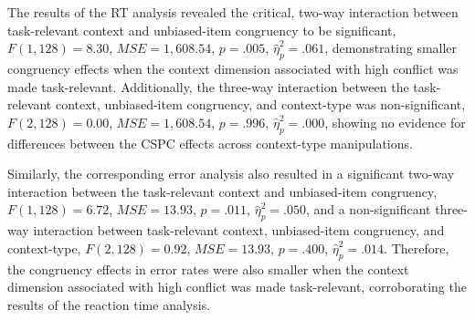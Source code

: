 \documentclass[english,,man,floatsintext]{apa6}
\begin{document}
The results of the RT analysis revealed the critical, two-way
interaction between task-relevant context and unbiased-item congruency
to be significant, \(F(1, 128) = 8.30\), \(\mathit{MSE} = 1,608.54\),
\(p = .005\), \(\hat{\eta}^2_p = .061\), demonstrating smaller
congruency effects when the context dimension associated with high
conflict was made task-relevant. Additionally, the three-way interaction
between the task-relevant context, unbiased-item congruency, and
context-type was non-significant, \(F(2, 128) = 0.00\),
\(\mathit{MSE} = 1,608.54\), \(p = .996\), \(\hat{\eta}^2_p = .000\),
showing no evidence for differences between the CSPC effects across
context-type manipulations.

Similarly, the corresponding error analysis also resulted in a
significant two-way interaction between the task-relevant context and
unbiased-item congruency, \(F(1, 128) = 6.72\),
\(\mathit{MSE} = 13.93\), \(p = .011\), \(\hat{\eta}^2_p = .050\), and a
non-significant three-way interaction between task-relevant context,
unbiased-item congruency, and context-type, \(F(2, 128) = 0.92\),
\(\mathit{MSE} = 13.93\), \(p = .400\), \(\hat{\eta}^2_p = .014\).
Therefore, the congruency effects in error rates were also smaller when
the context dimension associated with high conflict was made
task-relevant, corroborating the results of the reaction time analysis.
\end{document}
